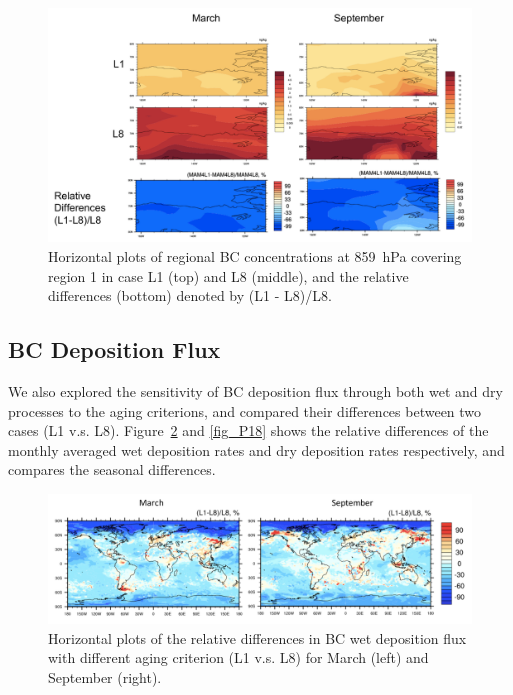 \documentclass[12pt, fullpage]{uiucthesis2009}
\begin{document}
	
	\begin{figure}[h] 
		\begin{center}
			\includegraphics[width = 1\textwidth]{Figure20}
			\caption[Horizontal plots of regional BC concentrations at 859~hPa covering region 1 in case L1 (top) and L8 (middle), and the relative differences (bottom) denoted by (L1 - L8)/L8]{\label{fig_P20} Horizontal plots of regional BC concentrations at 859~hPa covering region 1 in case L1 (top) and L8 (middle), and the relative differences (bottom) denoted by (L1 - L8)/L8.}
		\end{center}
	\end{figure}
	
	\subsection{BC Deposition Flux}
	We also explored the sensitivity of BC deposition flux through both wet and dry processes to the aging criterions, and compared their differences between two cases (L1 v.s. L8). Figure~\ref{fig_P17} and \ref{fig_P18} shows the relative differences of the monthly averaged wet deposition rates and dry deposition rates respectively, and compares the seasonal differences. 
	
	\begin{figure}[h] 
		\begin{center}
			\includegraphics[width = 1\textwidth]{Figure17}
			\caption[Horizontal plots of the relative differences in BC wet deposition flux with different aging criterion (L1 v.s. L8) for March (left) and September (right).]{\label{fig_P17} Horizontal plots of the relative differences in BC wet deposition flux with different aging criterion (L1 v.s. L8) for March (left) and September (right).}
		\end{center}
	\end{figure}
	
\end{document}
